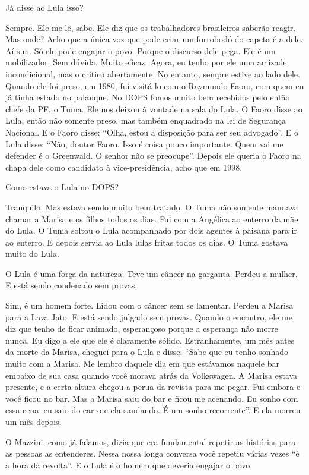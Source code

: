  Já disse ao Lula isso?

 Sempre. Ele me lê, sabe. Ele diz que os trabalhadores brasileiros
saberão reagir. Mas onde? Acho que a única voz que pode criar um
forrobodó do capeta é a dele. Aí sim. Só ele pode engajar o povo. Porque
o discurso dele pega. Ele é um mobilizador. Sem dúvida. Muito eficaz.
Agora, eu tenho por ele uma amizade incondicional, mas o critico
abertamente. No entanto, sempre estive ao lado dele. Quando ele foi
preso, em 1980, fui visitá-lo com o Raymundo Faoro, com quem eu já tinha
estado no palanque. No DOPS fomos muito bem recebidos pelo então chefe
da PF, o Tuma. Ele nos deixou à vontade na sala do Lula. O Faoro disse
ao Lula, então não somente preso, mas também enquadrado na lei de
Segurança Nacional. E o Faoro disse: ``Olha, estou a disposição para ser
seu advogado''. E o Lula disse: ``Não, doutor Faoro. Isso é coisa pouco
importante. Quem vai me defender é o Greenwald. O senhor não se
preocupe''. Depois ele queria o Faoro na chapa dele como candidato à
vice-presidência, acho que em 1998.

 Como estava o Lula no DOPS?

 Tranquilo. Mas estava sendo muito bem tratado. O Tuma não somente
mandava chamar a Marisa e os filhos todos os dias. Fui com a Angélica ao
enterro da mãe do Lula. O Tuma soltou o Lula acompanhado por dois
agentes à paisana para ir ao enterro. E depois servia ao Lula lulas
fritas todos os dias. O Tuma gostava muito do Lula.

 O Lula é uma força da natureza. Teve um câncer na garganta. Perdeu a
mulher. E está sendo condenado sem provas.

 Sim, é um homem forte. Lidou com o câncer sem se lamentar. Perdeu a
Marisa para a Lava Jato. E está sendo julgado sem provas. Quando o
encontro, ele me diz que tenho de ficar animado, esperançoso porque a
esperança não morre nunca. Eu digo a ele que ele é claramente sólido.
Estranhamente, um mês antes da morte da Marisa, cheguei para o Lula e
disse: ``Sabe que eu tenho sonhado muito com a Marisa. Me lembro daquele
dia em que estávamos naquele bar embaixo de sua casa quando você morava
atrás da Volkswagen. A Marisa estava presente, e a certa altura chegou a
perua da revista para me pegar. Fui embora e você ficou no bar. Mas a
Marisa saiu do bar e ficou me acenando. Eu sonho com essa cena: eu saio
do carro e ela saudando. É um sonho recorrente''. E ela morreu um mês
depois.

 O Mazzini, como já falamos, dizia que era fundamental repetir as
histórias para as pessoas as entenderes. Nessa nossa longa conversa você
repetiu várias vezes ``é a hora da revolta''. E o Lula é o homem que
deveria engajar o povo.

